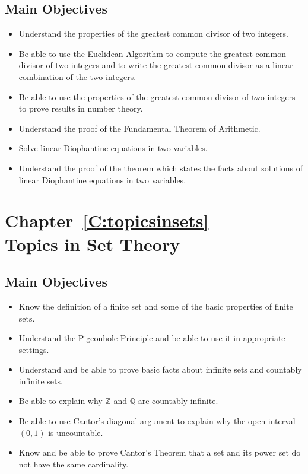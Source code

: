 \section*{Main Objectives}
\begin{itemize}
\item Understand the properties of the greatest common divisor of two integers.
\item Be able to use the Euclidean Algorithm to compute the greatest common divisor of two integers and to write the greatest common divisor as a linear combination of the two integers.
\item Be able to use the properties of the greatest common divisor of two integers to prove results in number theory.
\item Understand the proof of the Fundamental Theorem of Arithmetic.
\item Solve linear Diophantine equations in two variables.
\item Understand the proof of the theorem which states the facts about solutions of linear Diophantine equations in two variables.
\end{itemize}
\hbreak






\chapter*{Chapter~\ref{C:topicsinsets} \\Topics in Set Theory}

\section*{Main Objectives}
\begin{itemize}
\item Know the definition of a finite set and some of the basic properties of finite sets.
\item Understand the Pigeonhole Principle and be able to use it in appropriate settings.
\item Understand and be able to prove basic facts about infinite sets and countably infinite sets.
\item Be able to explain why $\mathbb{Z}$ and $\mathbb{Q}$ are countably infinite.
\item Be able to use Cantor's diagonal argument to explain why the open interval 
$\left( 0, 1 \right)$ is uncountable.
\item Know and be able to prove Cantor's Theorem that a set and its power set do not have the same cardinality.

\end{itemize}
\hbreak





\endinput

